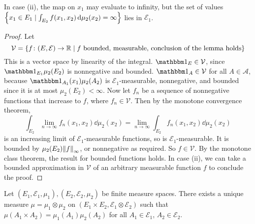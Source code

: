 \begin{remark}
	In case (ii), the map on \( x_1 \) may evaluate to infinity, but the set of values \( \qty{x_1 \in E_1 \mid \int_{E_2} f(x_1,x_2) \dd{\mu_2(x_2)} = \infty} \) lies in \( \mathcal E_1 \).
\end{remark}
\begin{proof}
	Let
	\[ \mathcal V = \qty{f \colon (E,\mathcal E) \to \mathbb R \mid f \text{ bounded, measurable, conclusion of the lemma holds}} \]
	This is a vector space by linearity of the integral.
	\( \mathbbm 1_E \in \mathcal V \), since \( \mathbbm 1_{E_1} \mu_2(E_2) \) is nonnegative and bounded.
	\( \mathbbm 1_A \in \mathcal V \) for all \( A \in \mathcal A \), because \( \mathbbm 1_{A_1}(x_1) \mu_2(A_2) \) is \( \mathcal E_1 \)-measurable, nonnegative, and bounded since it is at most \( \mu_2(E_2) < \infty \).
	Now let \( f_n \) be a sequence of nonnegative functions that increase to \( f \), where \( f_n \in \mathcal V \).
	Then by the monotone convergence theorem,
	\[ \int_{E_2} \lim_{n \to \infty} f_n(x_1, x_2) \dd{\mu_2(x_2)} = \lim_{n \to \infty} \int_{E_2} f_n(x_1, x_2) \dd{\mu_2(x_2)} \]
	is an increasing limit of \( \mathcal E_1 \)-measurable functions, so is \( \mathcal E_1 \)-measurable.
	It is bounded by \( \mu_2(E_2) \norm{f}_\infty \), or nonnegative as required.
	So \( f \in \mathcal V \).
	By the monotone class theorem, the result for bounded functions holds.
	In case (ii), we can take a bounded approximation in \( \mathcal V \) of an arbitrary measurable function \( f \) to conclude the proof.
\end{proof}
\begin{theorem}
	Let \( (E_1, \mathcal E_1, \mu_1), (E_2, \mathcal E_2, \mu_2) \) be finite measure spaces.
	There exists a unique measure \( \mu = \mu_1 \otimes \mu_2 \) on \( (E_1 \times E_2, \mathcal E_1 \otimes \mathcal E_2) \) such that \( \mu(A_1 \times A_2) = \mu_1(A_1) \mu_2(A_2) \) for all \( A_1 \in \mathcal E_1 \), \( A_2 \in \mathcal E_2 \).
\end{theorem}
